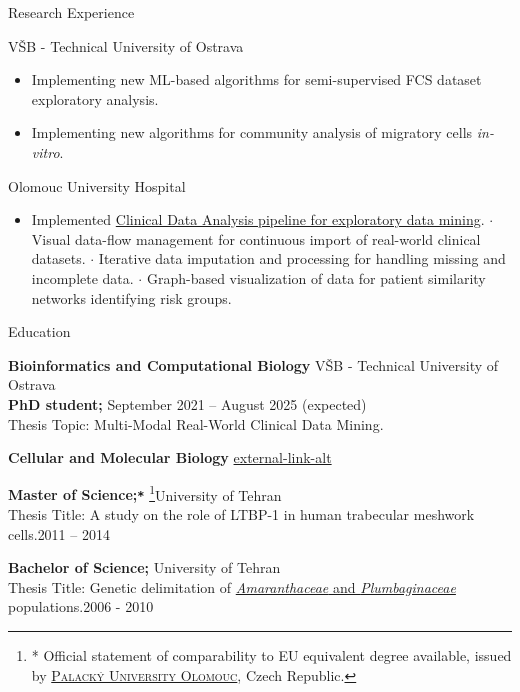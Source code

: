 \documentclass{resume}
\begin{document}
\begin{rSection}{Research Experience}
\vspace{-1em}
\item {V\v{S}B - Technical University of Ostrava}
    \begin{itemize}
        \itemsep -2.22pt {}
                 \item Implementing new ML-based algorithms for semi-supervised FCS dataset exploratory analysis.
                 \item Implementing new algorithms for community analysis of migratory cells \textit{in-vitro}.
    \end{itemize}
\item {Olomouc University Hospital} \hfill {\tiny \href{http://olgen.cz/en/team-members}{}}


    \begin{itemize}
        \item Implemented \href{https://doi.org/10.1007/978-3-031-40971-4_41}{Clinical Data Analysis pipeline for exploratory data mining}.
        \itemsep -2.22pt {}
            \subitem $\cdot$ Visual data-flow management for continuous import of real-world clinical datasets.
            \subitem $\cdot$ Iterative data imputation and processing for handling missing and incomplete data.
            \subitem $\cdot$ Graph-based visualization of data for patient similarity networks identifying risk groups.
    \end{itemize}
\end{rSection}

\begin{rSection}{Education}

\textbf{Bioinformatics and Computational Biology} \hfill{V\v{S}B - Technical University of Ostrava}\\
{\bf PhD student;} \hfill {September 2021 -- August 2025 (expected)}\\
Thesis Topic: Multi-Modal Real-World Clinical Data Mining. \hfill {\tiny{{\href{https://www.vsb.cz/en/study/degree-students/degree-studies/doctoral-degree/doctoral-degree-detail/?programmeId=836}{}}}}

\textbf{Cellular and Molecular Biology} \hfill{\tiny{{\href{https://science.ut.ac.ir/en/web/biology/cell-mol-biology}{\faIcon
{external-link-alt}}}}}

\textbf{Master of Science;\texttt{*}} \let\thefootnote\relax\footnote{* Official statement of comparability to EU equivalent degree available, issued by \href{https://www.upol.cz/en/}{\textsc{Palacký University Olomouc}}, Czech Republic.}\hfill {University of Tehran}\\
Thesis Title: A study on the role of LTBP-1 in human trabecular meshwork cells.\hfill {2011 -- 2014}
 
\textbf{Bachelor of Science;}  \hfill{University of Tehran}\\
 Thesis Title: Genetic delimitation of \href{https://onlinelibrary.wiley.com/doi/abs/10.1111/boj.12015}{\textit{Amaranthaceae} and \textit{Plumbaginaceae}} populations.\hfill {2006 - 2010}
 
\end{rSection}
\end{document}

